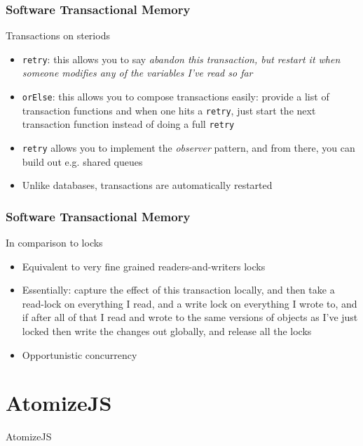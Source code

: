 \documentclass{beamer}
\begin{document}
\begin{frame}
  \frametitle{Software Transactional Memory}

  \begin{block}{Transactions on steriods}
    \begin{itemize}
    \item
      \texttt{retry}: this allows you to say {\em abandon this
        transaction, but restart it when someone modifies any of the
        variables I've read so far}
    \item
      \texttt{orElse}: this allows you to compose transactions easily:
      provide a list of transaction functions and when one hits a
      \texttt{retry}, just start the next transaction function instead
      of doing a full \texttt{retry}
    \item
      \texttt{retry} allows you to implement the {\em observer}
      pattern, and from there, you can build out e.g. shared queues
    \item
      Unlike databases, transactions are automatically restarted
    \end{itemize}
  \end{block}
\end{frame}

\begin{frame}
  \frametitle{Software Transactional Memory}

  \begin{block}{In comparison to locks}
    \begin{itemize}
    \item
      Equivalent to very fine grained readers-and-writers locks
    \item
      Essentially: capture the effect of this transaction locally, and
      then take a read-lock on everything I read, and a write lock on
      everything I wrote to, and if after all of that I read and wrote
      to the same versions of objects as I've just locked then write
      the changes out globally, and release all the locks
    \item
      Opportunistic concurrency
    \end{itemize}
  \end{block}
\end{frame}

\section{AtomizeJS}

\begin{frame}
  \centering
  \LARGE

  AtomizeJS

\end{frame}
\end{document}
